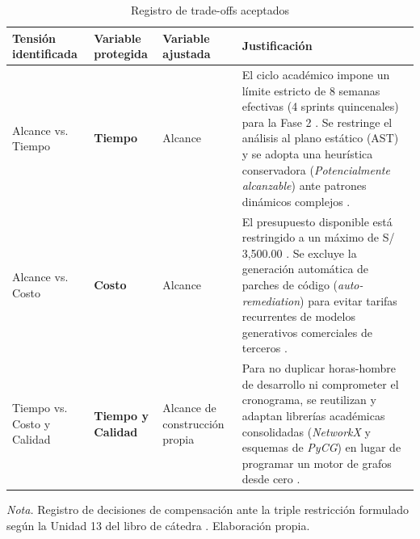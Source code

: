 \begin{table}[H]
\centering
\caption{Registro de trade-offs aceptados}
\label{tab:registro_tradeoffs}
\small
{}
\begin{tabularx}{\textwidth}{>{\raggedright\arraybackslash}p{3.5cm} >{\centering\arraybackslash}p{2.2cm} >{\centering\arraybackslash}p{2.2cm} >{\raggedright\arraybackslash}X}
\toprule
\textbf{Tensión identificada} & \textbf{Variable protegida} & \textbf{Variable ajustada} & \textbf{Justificación} \\
\midrule
Alcance vs. Tiempo & \textbf{Tiempo} & Alcance & 
El ciclo académico impone un límite estricto de 8 semanas efectivas (4 sprints quincenales) para la Fase 2 \parencite{torres2026proyecto}. %
Se restringe el análisis al plano estático (AST) y se adopta una heurística conservadora (\textit{Potencialmente alcanzable}) ante patrones dinámicos complejos \parencite{salis2021pycg}. \\ %
\addlinespace
Alcance vs. Costo & \textbf{Costo} & Alcance & 
El presupuesto disponible está restringido a un máximo de S/ 3,500.00 \parencite{torres2026proyecto}. %
Se excluye la generación automática de parches de código (\textit{auto-remediation}) para evitar tarifas recurrentes de modelos generativos comerciales de terceros \parencite{bogart2016break}. \\ %
\addlinespace
Tiempo vs. Costo y Calidad & \textbf{Tiempo y Calidad} & Alcance de construcción propia & 
Para no duplicar horas-hombre de desarrollo ni comprometer el cronograma, se reutilizan y adaptan librerías académicas consolidadas (\textit{NetworkX} y esquemas de \textit{PyCG}) en lugar de programar un motor de grafos desde cero \parencite{hagberg2008exploring, salis2021pycg}. \\ %
\bottomrule
\end{tabularx}
\vspace{2pt}
\begin{flushleft}
\scriptsize \textit{Nota.} Registro de decisiones de compensación ante la triple restricción formulado según la Unidad 13 del libro de cátedra \parencite{torres2026proyecto}. Elaboración propia. %
\end{flushleft}
\end{table}

